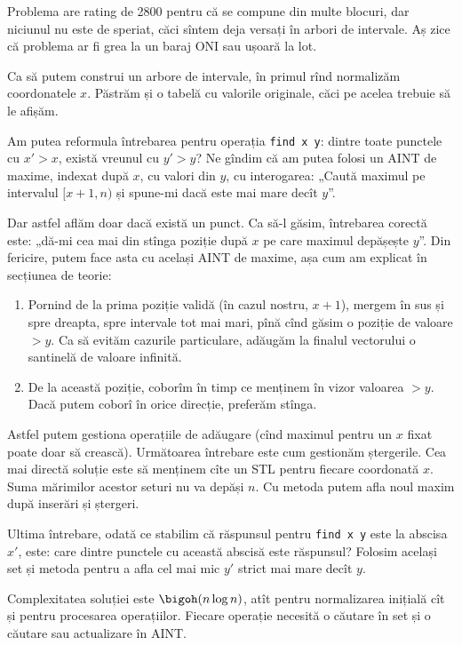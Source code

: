 Problema are rating de 2800 pentru că se compune din multe blocuri, dar niciunul nu este de speriat, căci sîntem deja versați în arbori de intervale.  Aș zice că problema ar fi grea la un baraj ONI sau ușoară la lot.

Ca să putem construi un arbore de intervale, în primul rînd normalizăm coordonatele $x$. Păstrăm și o tabelă cu valorile originale, căci pe acelea trebuie să le afișăm.

Am putea reformula întrebarea pentru operația \texttt{find x y}: dintre toate punctele cu $x'>x$, există vreunul cu $y' > y$? Ne gîndim că am putea folosi un AINT de maxime, indexat după $x$, cu valori din $y$, cu interogarea: „Caută maximul pe intervalul $[x + 1, n)$ și spune-mi dacă este mai mare decît $y$”.

Dar astfel aflăm doar dacă există un punct. Ca să-l găsim, întrebarea corectă este: „dă-mi cea mai din stînga poziție după $x$ pe care maximul depășește $y$”. Din fericire, putem face asta cu același AINT de maxime, așa cum am explicat în secțiunea de teorie:

\begin{enumerate}
  \item Pornind de la prima poziție validă (în cazul nostru, $x+1$), mergem în sus și spre dreapta, spre intervale tot mai mari, pînă cînd găsim o poziție de valoare $> y$. Ca să evităm cazurile particulare, adăugăm la finalul vectorului o santinelă de valoare infinită.

  \item De la această poziție, coborîm în timp ce menținem în vizor valoarea $> y$. Dacă putem coborî în orice direcție, preferăm stînga.
\end{enumerate}

Astfel putem gestiona operațiile de adăugare (cînd maximul pentru un $x$ fixat poate doar să crească). Următoarea întrebare este cum gestionăm ștergerile. Cea mai directă soluție este să menținem cîte un  STL pentru fiecare coordonată $x$. Suma mărimilor acestor seturi nu va depăși $n$. Cu metoda  putem afla noul maxim după inserări și ștergeri.

Ultima întrebare, odată ce stabilim că răspunsul pentru \texttt{find x y} este la abscisa $x'$, este: care dintre punctele cu această abscisă este răspunsul? Folosim același set și metoda  pentru a afla cel mai mic $y'$ strict mai mare decît $y$.

Complexitatea soluției este $\bigoh(n \log n)$, atît pentru normalizarea inițială cît și pentru procesarea operațiilor. Fiecare operație necesită o căutare în set și o căutare sau actualizare în AINT.

